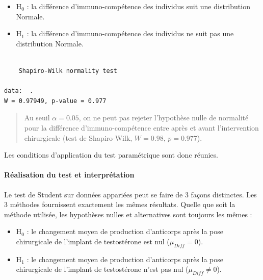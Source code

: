 \documentclass[a4paperpaper,]{article}
\newenvironment{Shaded}{\begin{snugshade}}{\end{snugshade}}
\newcommand{\KeywordTok}[1]{\textcolor[rgb]{0.12,0.11,0.11}{\textbf{#1}}}
\newcommand{\NormalTok}[1]{\textcolor[rgb]{0.12,0.11,0.11}{#1}}
\newcommand{\OperatorTok}[1]{\textcolor[rgb]{0.12,0.11,0.11}{#1}}
\newcommand{\StringTok}[1]{\textcolor[rgb]{0.75,0.01,0.01}{#1}}
\providecommand{\tightlist}{%
  \setlength{\itemsep}{0pt}\setlength{\parskip}{0pt}}
\let\oldparagraph\paragraph
\renewcommand{\paragraph}[1]{\oldparagraph{#1}\mbox{}}
\begin{document}
\begin{itemize}
\tightlist
\item
  H\(_0\) : la différence d'immuno-compétence des individus suit une distribution Normale.
\item
  H\(_1\) : la différence d'immuno-compétence des individus ne suit pas une distribution Normale.
\end{itemize}

\begin{Shaded}
\end{Shaded}

\begin{verbatim}

    Shapiro-Wilk normality test

data:  .
W = 0.97949, p-value = 0.977
\end{verbatim}

\begin{quote}
Au seuil \(\alpha = 0.05\), on ne peut pas rejeter l'hypothèse nulle de normalité pour la différence d'immuno-compétence entre après et avant l'intervention chirurgicale (test de Shapiro-Wilk, \(W = 0.98\), \(p = 0.977\)).
\end{quote}

Les conditions d'application du test paramétrique sont donc réunies.

\hypertarget{ruxe9alisation-du-test-et-interpruxe9tation-1}{%
\paragraph{Réalisation du test et interprétation}\label{ruxe9alisation-du-test-et-interpruxe9tation-1}}

Le test de Student sur données appariées peut se faire de 3 façons distinctes. Les 3 méthodes fournissent exactement les mêmes résultats. Quelle que soit la méthode utilisée, les hypothèses nulles et alternatives sont toujours les mêmes :

\begin{itemize}
\tightlist
\item
  H\(_0\) : le changement moyen de production d'anticorps après la pose chirurgicale de l'implant de testostérone est nul (\(\mu_{Diff} = 0\)).
\item
  H\(_1\) : le changement moyen de production d'anticorps après la pose chirurgicale de l'implant de testostérone n'est pas nul (\(\mu_{Diff} \neq 0\)).
\end{itemize}
\end{document}
